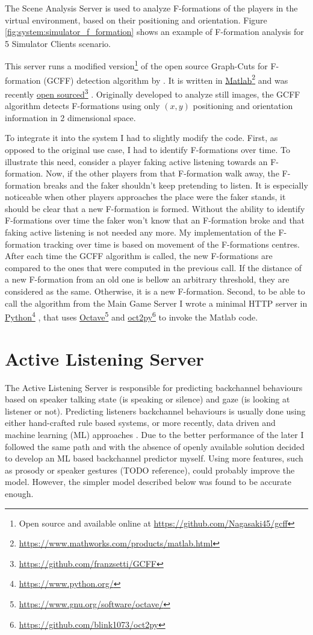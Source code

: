 \documentclass[]{simple-thesis}
\newcommand\fnurl[2]{%
  \href{#2}{#1}\footnote{\url{#2}}%
}
\begin{document}
The Scene Analysis Server is used to analyze F-formations of the players in the virtual environment, based on their positioning and orientation.
Figure \ref{fig:system:simulator_f_formation} shows an example of F-formation analysis for 5 Simulator Clients scenario.

This server runs a modified version\footnote{Open source and available online at \url{https://github.com/Nagasaki45/gcff}} of the open source Graph-Cuts for F-formation (GCFF) detection algorithm by \cite{Setti2015}.
It is written in \fnurl{Matlab}{https://www.mathworks.com/products/matlab.html} and was recently \fnurl{open sourced}{https://github.com/franzsetti/GCFF}.
Originally developed to analyze still images, the GCFF algorithm detects F-formations using only $(x, y)$ positioning and orientation information in 2 dimensional space.

To integrate it into the system I had to slightly modify the code.
First, as opposed to the original use case, I had to identify F-formations over time.
To illustrate this need, consider a player faking active listening towards an F-formation.
Now, if the other players from that F-formation walk away, the F-formation breaks and the faker shouldn't keep pretending to listen.
It is especially noticeable when other players approaches the place were the faker stands, it should be clear that a new F-formation is formed.
Without the ability to identify F-formations over time the faker won't know that an F-formation broke and that faking active listening is not needed any more.
My implementation of the F-formation tracking over time is based on movement of the F-formations centres.
After each time the GCFF algorithm is called, the new F-formations are compared to the ones that were computed in the previous call.
If the distance of a new F-formation from an old one is bellow an arbitrary threshold, they are considered as the same.
Otherwise, it is a new F-formation.
Second, to be able to call the algorithm from the Main Game Server I wrote a minimal HTTP server in \fnurl{Python}{https://www.python.org/}, that uses \fnurl{Octave}{https://www.gnu.org/software/octave/} and \fnurl{oct2py}{https://github.com/blink1073/oct2py} to invoke the Matlab code.

\section{Active Listening Server}\label{system:active_listening_server}

The Active Listening Server is responsible for predicting backchannel behaviours based on speaker talking state (is speaking or silence) and gaze (is looking at listener or not).
Predicting listeners backchannel behaviours is usually done using either hand-crafted rule based systems, or more recently, data driven and machine learning (ML) approaches \citep{Morency2008}.
Due to the better performance of the later I followed the same path and with the absence of openly available solution decided to develop an ML based backchannel predictor myself.
Using more features, such as prosody \citep{Ward2000} or speaker gestures (TODO reference), could probably improve the model.
However, the simpler model described below was found to be accurate enough.
\end{document}
